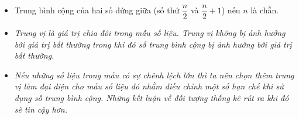 \begin{itemize}
\begin{tcolorbox}[colframe=orange,colback=white,boxrule=0.2mm]
\begin{itemize}
			\item Trung bình cộng của hai số đứng giữa (số thứ $\dfrac{n}{2}$ và $\dfrac{n}{2}+1$) nếu $n$ là chẵn.
		\end{itemize}
	\end{tcolorbox}
\begin{itemize}
	\item \textit{Trung vị là giá trị chia đôi trong mẫu số liệu. Trung vị không bị ảnh hưởng bởi giá trị bất thường trong khi đó số trung bình cộng bị ảnh hưởng bởi giá trị bất thường.}
	\item \textit{Nếu những số liệu trong mẫu có sự chênh lệch lớn thì ta nên chọn thêm trung vị làm đại diện cho mẫu số liệu đó nhằm điều chỉnh một số hạn chế khi sử dụng số trung bình cộng. Những kết luận về đối tượng thống kê rút ra khi đó sẽ tin cậy hơn.}
\end{itemize}
\end{itemize}
